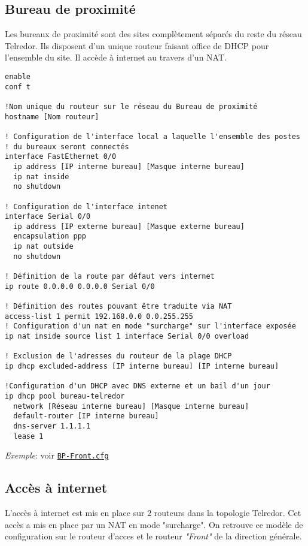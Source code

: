 \documentclass{article}
\newcommand{\tlr}{Telredor\xspace}
\newcommand{\seefile}[1]{
  \begin{center}
  \begin{minipage}{0.9\textwidth}
    \emph{Exemple}: voir \texttt{\href{https://github.com/EpicKiwi/Wide-Network-Project-Cesi-A4/blob/master/network/#1}{#1}}
  \end{minipage}
  \end{center}
}
\begin{document}
\subsection{Bureau de proximité}

Les bureaux de proximité sont des sites complètement séparés du reste du réseau \tlr.
Ils disposent d'un unique routeur faisant office de DHCP pour l'ensemble du site.
Il accède à internet au travers d'un NAT.

\begin{lstlisting}[caption=Configuration d'un routeur de bureau de proximité]
enable
conf t

!Nom unique du routeur sur le réseau du Bureau de proximité
hostname [Nom routeur]

! Configuration de l'interface local a laquelle l'ensemble des postes
! du bureaux seront connectés
interface FastEthernet 0/0
  ip address [IP interne bureau] [Masque interne bureau]
  ip nat inside
  no shutdown

! Configuration de l'interface intenet
interface Serial 0/0
  ip address [IP externe bureau] [Masque externe bureau]
  encapsulation ppp
  ip nat outside
  no shutdown

! Définition de la route par défaut vers internet
ip route 0.0.0.0 0.0.0.0 Serial 0/0

! Définition des routes pouvant être traduite via NAT
access-list 1 permit 192.168.0.0 0.0.255.255
! Configuration d'un nat en mode "surcharge" sur l'interface exposée
ip nat inside source list 1 interface Serial 0/0 overload

! Exclusion de l'adresses du routeur de la plage DHCP
ip dhcp excluded-address [IP interne bureau] [IP interne bureau]

!Configuration d'un DHCP avec DNS externe et un bail d'un jour
ip dhcp pool bureau-telredor
  network [Réseau interne bureau] [Masque interne bureau]
  default-router [IP interne bureau]
  dns-server 1.1.1.1
  lease 1
\end{lstlisting}

\seefile{BP-Front.cfg}

\subsection{Accès à internet}

L'accès à internet est mis en place sur 2 routeurs dans la topologie \tlr.
Cet accès a mis en place par un NAT en mode "surcharge".
On retrouve ce modèle de configuration sur le routeur d'acces et le routeur \emph{"Front"} de la direction générale.
\end{document}

